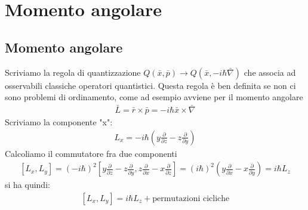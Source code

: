 


%
\chapter{Momento angolare} %
\section{Momento angolare} %
Scriviamo la regola di quantizzazione $Q\left(\bar x,\bar p\right) \rightarrow Q\left(\bar x,-i\hbar \bar\nabla \right)$ che associa ad osservabili classiche operatori quantistici. Questa regola è ben definita se non ci sono problemi di ordinamento, come ad esempio avviene per il momento angolare
\begin{equation}\begin{split}
\bar L=\bar r\times \bar p=-i\hbar \bar x\times \bar \nabla 
\end{split}\end{equation}
Scriviamo la componente "x":
\begin{equation}\begin{split}
L_x=-i\hbar \left(y\frac{\partial }{\partial z}-z\frac{\partial }{\partial y}\right)
\end{split}\end{equation}
Calcoliamo il commutatore fra due componenti
\begin{equation}\begin{split}
[L_x,L_y]=\left(-i\hbar \right)^2\left[y\frac{\partial }{\partial z}-z\frac{\partial }{\partial y},z\frac{\partial }{\partial x}-x\frac{\partial }{\partial z}\right]=(i\hbar)^2\left(y\frac{\partial }{\partial x}-x\frac{\partial }{\partial y}\right)=i\hbar L_z
\end{split}\end{equation}
si ha quindi:
\begin{equation}\begin{split}
\left[L_x,L_y\right]=i\hbar L_z + \textrm{permutazioni cicliche}
\end{split}\end{equation}

